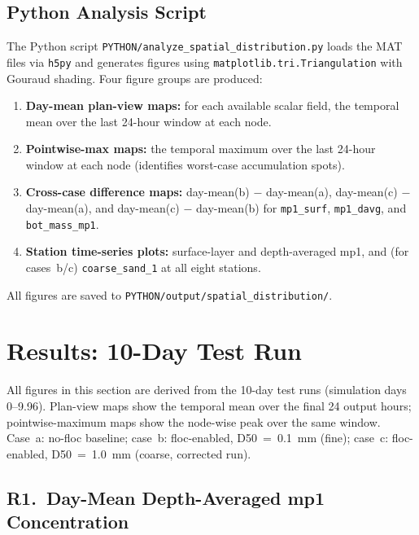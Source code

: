 \documentclass[11pt]{article}
\begin{document}
\subsection*{Python Analysis Script}

The Python script \texttt{PYTHON/analyze\_spatial\_distribution.py} loads
the MAT files via \texttt{h5py} and generates figures using
\texttt{matplotlib.tri.Triangulation} with Gouraud shading.  Four figure
groups are produced:

\begin{enumerate}[(1)]
  \item \textbf{Day-mean plan-view maps:} for each available scalar field,
        the temporal mean over the last 24-hour window at each node.
  \item \textbf{Pointwise-max maps:} the temporal maximum over the last
        24-hour window at each node (identifies worst-case accumulation spots).
  \item \textbf{Cross-case difference maps:} day-mean(b) $-$ day-mean(a),
        day-mean(c) $-$ day-mean(a), and day-mean(c) $-$ day-mean(b) for
        \texttt{mp1\_surf}, \texttt{mp1\_davg}, and \texttt{bot\_mass\_mp1}.
  \item \textbf{Station time-series plots:} surface-layer and depth-averaged
        mp1, and (for cases~b/c) \texttt{coarse\_sand\_1} at all eight stations.
\end{enumerate}

All figures are saved to \texttt{PYTHON/output/spatial\_distribution/}.

\section*{Results: 10-Day Test Run}

All figures in this section are derived from the 10-day test runs
(simulation days 0--9.96).  Plan-view maps show the temporal mean
over the final 24 output hours; pointwise-maximum maps show the
node-wise peak over the same window.
Case~a: no-floc baseline; case~b: floc-enabled, D50~=~0.1~mm (fine);
case~c: floc-enabled, D50~=~1.0~mm (coarse, corrected run).

\subsection*{R1.\ Day-Mean Depth-Averaged mp1 Concentration}
\end{document}
